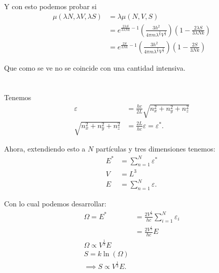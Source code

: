\documentclass{report}
\begin{document}
Y con esto podemos probar si
\begin{align*}
  \mu\left(\lambda N, \lambda V, \lambda S\right) &= \lambda \mu \left(N, V, S\right)\\
  &= e^{\frac{2\lambda S}{3\lambda Nk} -1} \left(\frac{3h^2}{4 \pi m \lambda^{\frac{2}{3}}V^{\frac{2}{3}}}\right)\left(1 -\frac{2\lambda S}{3\lambda N k} \right)\\
  &= e^{\frac{2S}{3Nk} -1} \left(\frac{3h^2}{4 \pi m \lambda^{\frac{2}{3}}V^{\frac{2}{3}}}\right)\left(1 -\frac{2S}{3N k} \right)
\end{align*}

Que como se ve no se coincide con una cantidad intensiva.

\section{}
\section{}

\chapter{}

Tenemos
\begin{align*}
  \varepsilon &= \frac{hc}{2L}\sqrt{n_x^2 + n_y^2 + n_z^2}  \\
  \sqrt{n_x^2 + n_y^2 + n_z^2} &= \frac{2L}{hc}\varepsilon = \varepsilon^{*}
.\end{align*}

Ahora, extendiendo esto a $N$ partículas y tres dimensiones tenemos:
\begin{align*}
  E^{*} &= \sum_{n=1}^{N} \varepsilon^{*} \\
  V &= L^{3} \\
  E &= \sum_{n=1}^{N} \varepsilon
.\end{align*}

Con lo cual podemos desarrollar:
\begin{align*}
  \Omega = E^{*} &= \frac{2V^{\frac{1}{3}}}{hc}\sum_{i=1}^{N} \varepsilon_i \\
  &= \frac{2V^{\frac{1}{3}}}{hc}E \\
  \Omega \propto V^{\frac{1}{3}}E\\
  S = k\ln\left( \Omega \right) \\
  \implies S \propto V^{\frac{1}{3}}E
.\end{align*}
\end{document}
